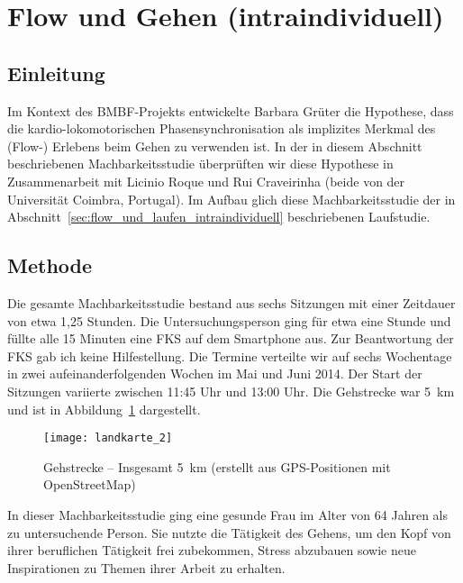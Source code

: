 

\section{Flow und Gehen (intraindividuell)} 

\label{sec:flow_und_gehen_intraindividuell}

\subsection{Einleitung} 

\label{sub:einleitung_5_2}

Im Kontext des \acs{BMBF}-Projekts entwickelte Barbara Grüter die Hypothese, dass die kardio-lokomotorischen Phasensynchronisation als implizites Merkmal des (Flow-) Erlebens beim Gehen zu verwenden ist. In der in diesem Abschnitt beschriebenen Machbarkeitsstudie überprüften wir diese Hypothese in Zusammenarbeit mit Licinio Roque und Rui Craveirinha (beide von der Universität Coimbra, Portugal). Im Aufbau glich diese Machbarkeitsstudie der in Abschnitt~\ref{sec:flow_und_laufen_intraindividuell} beschriebenen Laufstudie. 

\subsection{Methode} 

\label{sub:methode_5_2}

Die gesamte Machbarkeitsstudie bestand aus sechs Sitzungen mit einer Zeitdauer von etwa 1,25 Stunden. Die Untersuchungsperson ging für etwa eine Stunde und füllte alle 15 Minuten eine \ac{FKS} auf dem Smartphone aus. Zur Beantwortung der \ac{FKS} gab ich keine Hilfestellung. Die Termine verteilte wir auf sechs Wochentage in zwei aufeinanderfolgenden Wochen im Mai und Juni 2014. Der Start der Sitzungen variierte zwischen 11:45 Uhr und 13:00 Uhr. Die Gehstrecke war 5~km und ist in Abbildung~\ref{fig:landkarte_2} dargestellt. 
\begin{figure}
	[!htb] \centering 
	\texttt{[image: landkarte\_2]} \caption[Gehstrecke]{Gehstrecke -- Insgesamt 5~km (erstellt aus GPS-Positionen mit OpenStreetMap)} \label{fig:landkarte_2} 
\end{figure}

In dieser Machbarkeitsstudie ging eine gesunde Frau im Alter von 64 Jahren als zu untersuchende Person. Sie nutzte die Tätigkeit des Gehens, um den Kopf von ihrer beruflichen Tätigkeit frei zubekommen, Stress abzubauen sowie neue Inspirationen zu Themen ihrer Arbeit zu erhalten.

